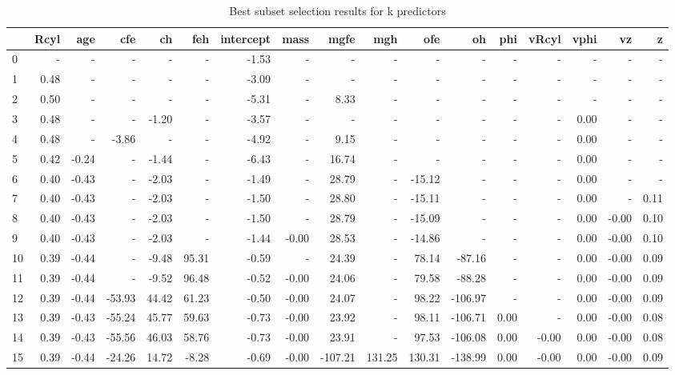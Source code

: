 \begin{table}[h!]
\caption{Best subset selection results for k predictors}
\label{tab:BestSubset}
\begin{tabular}{lrrrrrrrrrrrrrrrr}
\toprule
 & Rcyl & age & cfe & ch & feh & intercept & mass & mgfe & mgh & ofe & oh & phi & vRcyl & vphi & vz & z \\
\midrule
0 & - & - & - & - & - & -1.53 & - & - & - & - & - & - & - & - & - & - \\
1 & 0.48 & - & - & - & - & -3.09 & - & - & - & - & - & - & - & - & - & - \\
2 & 0.50 & - & - & - & - & -5.31 & - & 8.33 & - & - & - & - & - & - & - & - \\
3 & 0.48 & - & - & -1.20 & - & -3.57 & - & - & - & - & - & - & - & 0.00 & - & - \\
4 & 0.48 & - & -3.86 & - & - & -4.92 & - & 9.15 & - & - & - & - & - & 0.00 & - & - \\
5 & 0.42 & -0.24 & - & -1.44 & - & -6.43 & - & 16.74 & - & - & - & - & - & 0.00 & - & - \\
6 & 0.40 & -0.43 & - & -2.03 & - & -1.49 & - & 28.79 & - & -15.12 & - & - & - & 0.00 & - & - \\
7 & 0.40 & -0.43 & - & -2.03 & - & -1.50 & - & 28.80 & - & -15.11 & - & - & - & 0.00 & - & 0.11 \\
8 & 0.40 & -0.43 & - & -2.03 & - & -1.50 & - & 28.79 & - & -15.09 & - & - & - & 0.00 & -0.00 & 0.10 \\
9 & 0.40 & -0.43 & - & -2.03 & - & -1.44 & -0.00 & 28.53 & - & -14.86 & - & - & - & 0.00 & -0.00 & 0.10 \\
10 & 0.39 & -0.44 & - & -9.48 & 95.31 & -0.59 & - & 24.39 & - & 78.14 & -87.16 & - & - & 0.00 & -0.00 & 0.09 \\
11 & 0.39 & -0.44 & - & -9.52 & 96.48 & -0.52 & -0.00 & 24.06 & - & 79.58 & -88.28 & - & - & 0.00 & -0.00 & 0.09 \\
12 & 0.39 & -0.44 & -53.93 & 44.42 & 61.23 & -0.50 & -0.00 & 24.07 & - & 98.22 & -106.97 & - & - & 0.00 & -0.00 & 0.09 \\
13 & 0.39 & -0.43 & -55.24 & 45.77 & 59.63 & -0.73 & -0.00 & 23.92 & - & 98.11 & -106.71 & 0.00 & - & 0.00 & -0.00 & 0.08 \\
14 & 0.39 & -0.43 & -55.56 & 46.03 & 58.76 & -0.73 & -0.00 & 23.91 & - & 97.53 & -106.08 & 0.00 & -0.00 & 0.00 & -0.00 & 0.08 \\
15 & 0.39 & -0.44 & -24.26 & 14.72 & -8.28 & -0.69 & -0.00 & -107.21 & 131.25 & 130.31 & -138.99 & 0.00 & -0.00 & 0.00 & -0.00 & 0.09 \\
\bottomrule
\end{tabular}
\end{table}
